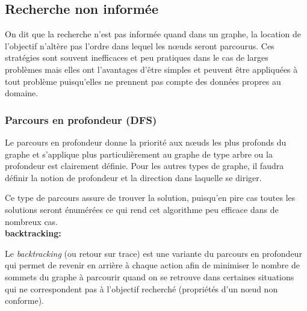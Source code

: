


\subsection{Recherche non informée}
On dit que la recherche n'est pas informée quand dans un graphe, la location de l'objectif n'altère pas l'ordre dans lequel les nœuds seront parcourus.
Ces stratégies sont souvent inefficaces et peu pratiques dans le cas de larges problèmes mais elles ont l'avantages d'être simples et peuvent être appliquées à tout problème puisqu'elles ne prennent  pas compte des données propres au domaine.

\subsubsection{Parcours en profondeur (DFS)}
Le parcours en profondeur donne la priorité aux nœuds les plus profonds du graphe et s'applique plus particulièrement au graphe de type arbre ou la profondeur est clairement définie.
Pour les autres types de graphe, il faudra définir la notion de profondeur et la direction dans laquelle se diriger.

Ce type de parcours assure de trouver la solution, puisqu'en pire cas toutes les solutions seront énumérées ce qui rend cet algorithme peu efficace dans de nombreux cas.\\

{\setlength{\parindent}{0cm}\textbf{backtracking:}}

Le \textit{backtracking} (ou retour sur trace) est une variante du parcours en profondeur qui permet de revenir en arrière à chaque action afin de minimiser le nombre de sommets du graphe à parcourir quand on se retrouve dans certaines situations qui ne correspondent pas à l'objectif recherché (propriétés d'un nœud non conforme).


